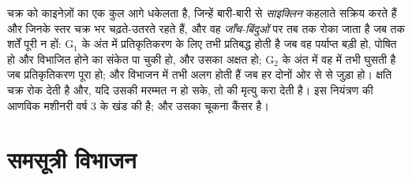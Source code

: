 \begin{proposition}[जाँच-बिंदु]\label{prop:b1:replication-mitosis:checkpoints}
चक्र को  काइनेज़ों का एक कुल आगे धकेलता है, जिन्हें बारी-बारी से
\emph{साइक्लिन} कहलाते  सक्रिय करते हैं और जिनके स्तर चक्र भर
चढ़ते-उतरते रहते हैं, और वह \emph{जाँच-बिंदुओं} पर तब तक रोका जाता है जब
तक शर्तें पूरी न हों: G$_1$ के अंत में  प्रतिकृतिकरण के लिए तभी
प्रतिबद्ध होती है जब वह पर्याप्त बड़ी हो, पोषित हो और विभाजित होने का
संकेत पा चुकी हो, और उसका  अक्षत हो; G$_2$ के अंत में वह  में तभी घुसती है जब प्रतिकृतिकरण पूरा हो; और विभाजन में 
तभी अलग होती हैं जब हर  दोनों ओर से  से जुड़ा हो। क्षति चक्र
रोक देती है और, यदि उसकी मरम्मत न हो सके, तो  की मृत्यु करा देती
है। इस नियंत्रण की आणविक मशीनरी वर्ष 3 के खंड की है; और उसका चूकना कैंसर
है।
\end{proposition}

\section{समसूत्री विभाजन}

